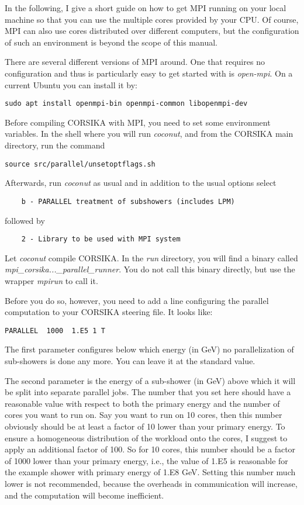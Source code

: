 \documentclass[a4paper,10pt]{article}
\begin{document}
In the following, I give a short guide on how to get MPI running on your local machine so that you can use the multiple cores provided by your CPU. Of course, MPI can also use cores distributed over different computers, but the configuration of such an environment is beyond the scope of this manual.

There are several different versions of MPI around. One that requires no configuration and thus is particularly easy to get started with is {\em open-mpi}. On a current Ubuntu you can install it by:
%
\begin{verbatim}
sudo apt install openmpi-bin openmpi-common libopenmpi-dev
\end{verbatim}
%
Before compiling CORSIKA with MPI, you need to set some environment variables. In the shell where you will run {\em coconut}, and from the CORSIKA main directory, run the command
%
\begin{verbatim}
source src/parallel/unsetoptflags.sh
\end{verbatim}
%
Afterwards, run {\em coconut} as usual and in addition to the usual options select
%
\begin{verbatim}
    b - PARALLEL treatment of subshowers (includes LPM)
\end{verbatim}
%
followed by
%
\begin{verbatim}
    2 - Library to be used with MPI system
\end{verbatim}
%
Let {\em coconut} compile CORSIKA. In the {\em run} directory, you will find a binary called {\em mpi\_corsika...\_parallel\_runner}. You do not call this binary directly, but use the wrapper {\em mpirun} to call it.

Before you do so, however, you need to add a line configuring the parallel computation to your CORSIKA steering file. It looks like:
%
\begin{verbatim}
PARALLEL  1000  1.E5 1 T
\end{verbatim}
%
The first parameter configures below which energy (in GeV) no parallelization of sub-showers is done any more. You can leave it at the standard value.

The second parameter is the energy of a sub-shower (in GeV) above which it will be split into separate parallel jobs. The number that you set here should have a reasonable value with respect to both the primary energy and the number of cores you want to run on. Say you want to run on 10 cores, then this number obviously should be at least a factor of 10 lower than your primary energy. To ensure a homogeneous distribution of the workload onto the cores, I suggest to apply an additional factor of 100. So for 10 cores, this number should be a factor of 1000 lower than your primary energy, i.e., the value of 1.E5 is reasonable for the example shower with primary energy of 1.E8 GeV. Setting this number much lower is not recommended, because the overheads in communication will increase, and the computation will become inefficient.
\end{document}
